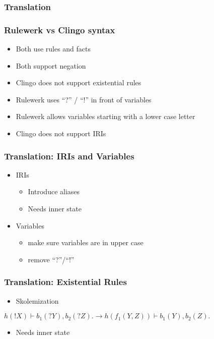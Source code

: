 \documentclass{beamer}
\begin{document}
\subsubsection{Translation}
\begin{frame}
\frametitle{Rulewerk vs Clingo syntax}
\begin{itemize}
\item Both use rules and facts
\item Both support negation
\item Clingo does not support existential rules
\item Rulewerk uses \enquote{?} / \enquote{!} in front of variables
\item Rulewerk allows variables starting with a lower case letter
\item Clingo does not support IRIs

\end{itemize}

\end{frame}



\begin{frame}
\frametitle{Translation: IRIs and Variables}
\begin{itemize}
\item IRIs
\begin{itemize}
\item Introduce aliases
\item Needs inner state
\end{itemize}
\item Variables
\begin{itemize}
\item make sure variables are in upper case
\item remove \enquote{?}/\enquote{!}
\end{itemize}
\end{itemize}


\end{frame}

\begin{frame}
\frametitle{Translation: Existential Rules}
\begin{itemize}
\item Skolemization
\end{itemize}
$ h(!X) \vdash b_1(?Y),b_2(?Z). \rightarrow h(f_1(Y,Z)) \vdash b_1(Y),b_2(Z).$
\begin{itemize}
\item Needs inner state
\end{itemize}

\end{frame}
\end{document}
